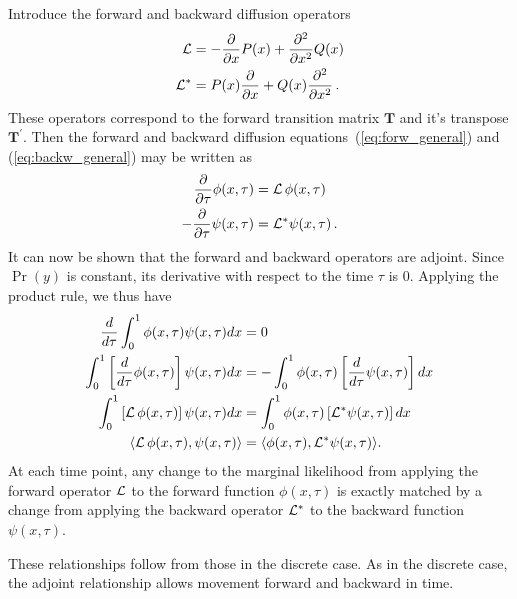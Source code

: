 \documentclass[preprint]{elsarticle}
\begin{document}
Introduce the forward and backward diffusion operators 
\begin{equation}
\begin{split}
    {\cal L}&=-\frac{\partial}{\partial x}P(x)+ \frac{\partial^2}{\partial x^2}Q(x)\\
    {\cal L}^{*}&=P(x)\frac{\partial}{\partial x} +Q(x)\frac{\partial^2}{\partial x^2}\,.
\end{split}
\end{equation}
These operators correspond to the forward transition matrix $\mathbf{T}$ and it's transpose $\mathbf{T}^{'}$. Then the forward and backward diffusion equations~(\ref{eq:forw_general}) and (\ref{eq:backw_general}) may be written as
\begin{equation}
\begin{split}
    \frac{\partial}{\partial \tau}\phi(x,\tau)&={\cal L}\,\phi(x,\tau)\\
    -\frac{\partial}{\partial \tau}\psi(x,\tau)&={\cal L}^{*}\psi(x,\tau)\,.
\end{split}
\end{equation}
It can now be shown that the forward and backward operators are adjoint. Since $\Pr(y)$ is constant, its derivative with respect to the time $\tau$ is $0$. Applying the product rule, we thus have
\begin{equation}\label{eq:adjoint_continuous}
\begin{split}
\frac{d}{d\tau}\int_{0}^{1} \phi(x,\tau) \psi(x,\tau)dx &= 0\\
\int_{0}^{1} \left[\frac{d}{d\tau} \phi(x,\tau)\right] \psi(x,\tau)dx &= -\int_{0}^{1} \phi(x,\tau) \left[\frac{d}{d\tau} \psi(x,\tau)\right] dx\\
\int_{0}^{1} \left[{\cal L}\,\phi(x,\tau)\right] \psi(x,\tau)dx &= \int_{0}^{1}  \phi(x,\tau) \left[{\cal L}^{*} \psi(x,\tau)\right] dx\\
\langle{\cal L}\,\phi(x,\tau), \psi(x,\tau)\rangle &= \langle \phi(x,\tau),{\cal L}^{*} \psi(x,\tau)\rangle.
\end{split}
\end{equation}
At each time point, any change to the marginal likelihood from applying the forward operator ${\cal L}$ to the forward function $\phi(x,\tau)$ is exactly matched by a change from applying the backward operator ${\cal L}^{*}$ to the backward function $\psi(x,\tau)$. 

These relationships follow from those in the discrete case. As in the discrete case, the adjoint relationship allows movement forward and backward in time. 
\end{document}
